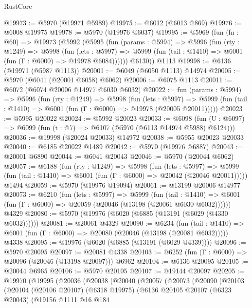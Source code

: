 \begin{lexlean}{RustCore}
\begin{coremodule}
@19973 := @5970 (@19971 @5989)
@19975 := @6012 (@6013 @869)
@19976 := @6008 @19975
@19978 := @5970 (@19976 @6037)
@19995 := @5969
    (fun (fn : @60) =>
    @19973
      (@5992
        (@5995
          (fun (params : @5994) =>
          @5996
            (fun (rty : @1249) =>
            @5998
              (fun (lets : @5997) =>
              @5999 (fun (tail : @1410) => @6001 (fun (Γ : @6000) => @19978 @6084))))))
        @6130))
    @1113
@19998 := @6136 (@19971 (@5987 @1113))
@20001 := @6049 (@6050 @1113) @14974
@20005 := @5970 (@6041 (@20001 @6058) @6062)
@20006 := @6075 @1113
@20011 := @6072 (@6074 @20006 @14977 @6030 @6032)
@20022 := fun (params : @5994) =>
  @5996
    (fun (rty : @1249) =>
    @5998
      (fun (lets : @5997) =>
      @5999 (fun (tail : @1410) => @6001 (fun (Γ : @6000) => @19978 (@20005 @20011)))))
@20023 := @5995 @20022
@20024 := @5992 @20023
@20033 := @6098
    (fun (U : @6097) => @6099 (fun (t : @7) => @6107 (@5970 (@6113 @14974 @5988) @6124)))
@20036 := @19998 (@20024 @20033) @14972
@20038 := @5955 @20023 @20033
@20040 := @6185 @20022 @1489
@20042 := @5970 (@19976 @6887)
@20043 := @20001 @6890
@20044 := @6041 @20043
@20046 := @5970 (@20044 @6062)
@20057 := @6188
    (fun (rty : @1249) =>
    @5998
      (fun (lets : @5997) =>
      @5999 (fun (tail : @1410) => @6001 (fun (Γ : @6000) => @20042 (@20046 @20011)))))
    @1494
@20059 := @5970 (@19976 @19094)
@20061 := @13199 @20006 @14977
@20073 := @6210
    (fun (lets : @5997) =>
    @5999
      (fun (tail : @1410) =>
      @6001 (fun (Γ : @6000) => @20059 (@20046 (@13198 (@20061 @6030 @6032))))))
    @4329
@20080 := @5970 (@19976 (@6020 (@6885 (@13191 (@6029 (@4330 @6032))))))
@20081 := @20061 @4329
@20090 := @6234
    (fun (tail : @1410) => @6001 (fun (Γ : @6000) => @20080 (@20046 (@13198 (@20081 @6032)))))
    @4338
@20095 := @19976 (@6020 (@6885 (@13191 (@6029 @4339))))
@20096 := @5970 @20095
@20097 := @20081 @4338
@20103 := @6252 (fun (Γ : @6000) => @20096 (@20046 (@13198 @20097))) @6962
@20104 := @6136 @20095
@20105 := @20044 @6965
@20106 := @5970 @20105
@20107 := @19144 @20097
@20205 := @19970
    (@19995
      (@20036
        (@20038
          (@20040
            (@20057
              (@20073
                (@20090
                  (@20103
                    (@20104
                      (@20106 @20107)
                      (@6318 @19975)
                      (@6136
                        @20105
                        @20107
                        (@6323 @20043)
                        (@19156
                          @1111
                          @16
                          @184

\end{coremodule}
\end{lexlean}
